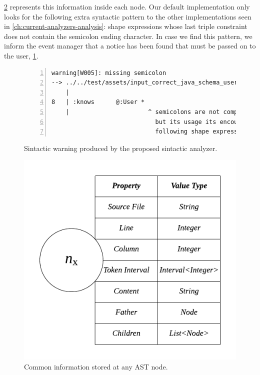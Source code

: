\cref{fig:shex-lite-node-info} represents this information inside each node. Our default implementation only looks for the
following extra syntactic pattern to the other implementations seen in \cref{ch:current-analyzers-analysis}: shape expressions whose last
triple constraint does not contain the semicolon ending character. In case we find this pattern, we inform the event manager
that a notice has been found that must be passed on to the user, \cref{fig:sin-err-example}.

\begin{figure}
    \begin{lstlisting}[numbers=left,basicstyle=\ttfamily\scriptsize]
warning[W005]: missing semicolon
--> ../../test/assets/input_correct_java_schema_user_car_1.shexl:8:23
    |
8   | :knows      @:User *
    |                      ^ semicolons are not compulsory in the last triple constraint,
                             but its usage its encouraged as otherwise your code wont be
                             following shape expressions specification.
    \end{lstlisting}
    \caption[Sintactic warning produced by the proposed sintactic analyzer]{Sintactic warning produced by the proposed sintactic analyzer.}
    \label{fig:sin-err-example}
\end{figure}

\begin{figure}
    \includegraphics[scale=0.7]{images/shex-lite-node-table.pdf}
    \centering
    \caption[Common information stored at any AST node]{Common information stored at any AST node.}
    \label{fig:shex-lite-node-info}
\end{figure}

